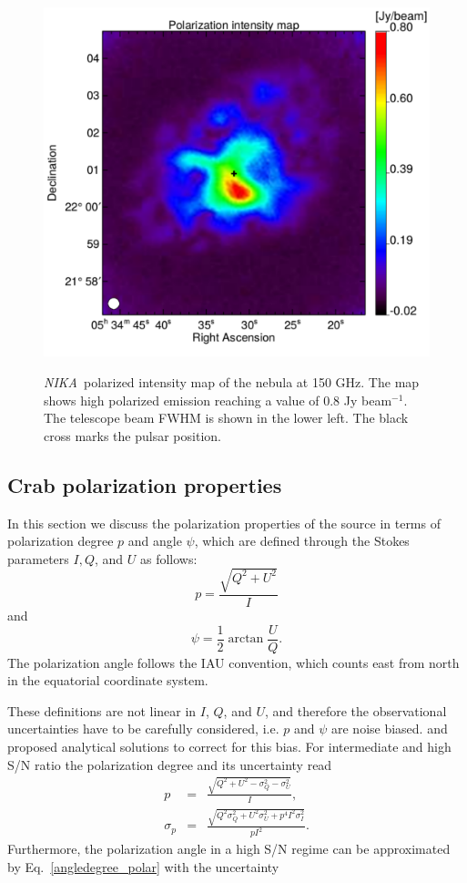 \documentclass[twocolumn,traditabstract]{aa}
\def\NIKA{\textit{NIKA}}
\begin{document}
 \begin{figure}
  \centering
      {\includegraphics[width=0.75\linewidth,keepaspectratio]{figures/Crab_ipol_v3_2mm.pdf}}
\caption{\NIKA\ polarized intensity map of the   nebula at 150 GHz. The map shows high polarized emission reaching a value of 0.8 Jy beam$^{-1}$. The telescope beam FWHM is shown in the lower left. The black cross marks the pulsar position.}
\label{crab_ipol_maps}          
  \end{figure}

\subsection{Crab polarization properties}\label{sec:pol_properties}
In this section we discuss the polarization properties of the source in terms of polarization degree $p$ and angle $\psi$, which are defined through the Stokes parameters $I, Q$, and $U$ as follows:
\begin{equation}
 p    = \frac{\sqrt{Q^2 + U^2}}{I} \nonumber 
\end{equation}
and
 \begin{equation}
 \psi = \frac{1}{2}\arctan\frac{U}{Q}.\label{angledegree_polar}
 \end{equation}
The polarization angle follows the IAU convention, which counts east from north in the equatorial coordinate system.

These definitions are not linear in $I$, $Q$, and $U$, and therefore the observational uncertainties have to be carefully considered, {i.e.} $p$ and $\psi$ are noise biased. 
\citet{1980A&A....91...97S,1985A&A...142..100S} and \citet{montier} proposed analytical solutions to correct for this bias. For intermediate and high S/N ratio the polarization degree and its uncertainty read
 \begin{eqnarray}
 p    &=& \frac{\sqrt{Q^2 + U^2 - \sigma_{Q}^2 - \sigma_{U}^2}}{I}, \nonumber \\ 
  \sigma_{p} &=& \frac{\sqrt{Q^2\sigma_Q^2 + U^2\sigma_U^2 + p^4I^2\sigma_I^2}}{pI^2}.
  \label{p_true_degree}
 \end{eqnarray}
Furthermore, the polarization angle in a high S/N regime can be approximated by Eq.~\ref{angledegree_polar} with the uncertainty
 
\end{document}
